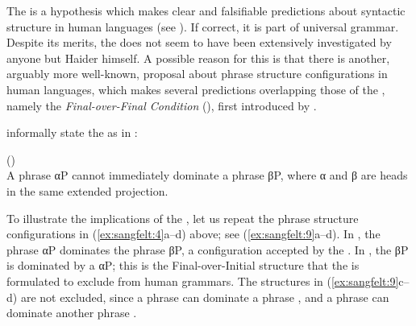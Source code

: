 \documentclass[output=paper, colorlinks, citecolor=brown]{langscibook}
\begin{document}
The  is a hypothesis which makes clear and falsifiable predictions about syntactic structure in human languages (see \citealt{Haider2013}). If correct, it is part of universal grammar. Despite its merits, the  does not seem to have been extensively investigated by anyone but Haider himself. A possible reason for this is that there is another, arguably more well-known, proposal about phrase structure configurations in human languages, which makes several predictions overlapping those of the , namely the \textit{Final-over-Final Condition} (), first introduced by \citet{Holmberg2000}.


\citet[171]{BiberauerEtAl2014} informally state the  as in : 

\ea {} ()\label{ex:sangfelt:8}\\
A  phrase αP cannot immediately dominate a  phrase βP, where
α and β are heads in the same extended projection.
\z 

To illustrate the implications of the , let us repeat the phrase structure configurations in (\ref{ex:sangfelt:4}a–d) above; see (\ref{ex:sangfelt:9}a–d). In , the  phrase αP dominates the  phrase βP, a configuration accepted by the . In , the  βP is dominated by a  αP; this is the Final-over-Initial structure that the  is formulated to exclude from human grammars. The structures in (\ref{ex:sangfelt:9}c–d) are not excluded, since a  phrase can dominate a  phrase , and a  phrase can dominate another  phrase .

\settowidth{}
\ea\label{ex:sangfelt:9}
\z 
\z 
\end{document}
